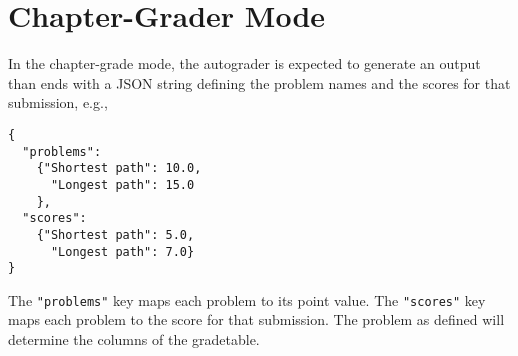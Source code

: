 \section{Chapter-Grader Mode}
\label{sec:codelabs::chapter}

\begin{gram}
\label{sec:codelabs::chapter::output}
  
In the chapter-grade mode, the autograder is expected to generate an
output than ends with a JSON string defining the problem names and the
scores for that submission, e.g.,
  
\begin{lstlisting}
{
  "problems":
    {"Shortest path": 10.0,
      "Longest path": 15.0
    },
  "scores":
    {"Shortest path": 5.0,
      "Longest path": 7.0}
}
\end{lstlisting}

The \lstinline`"problems"` key maps each problem to its point value.
The \lstinline`"scores"` key maps each problem to the score for that submission.
The problem as defined will determine the columns of the gradetable.
\end{gram}
